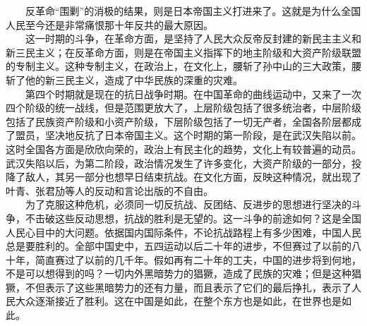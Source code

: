 \documentclass[cn,11pt,chinese]{elegantbook}
\begin{document}
　　反革命“围剿”的消极的结果，则是日本帝国主义打进来了。这就是为什么全国人民至今还是非常痛恨那十年反共的最大原因。\\
　　这一时期的斗争，在革命方面，是坚持了人民大众反帝反封建的新民主主义和新三民主义；在反革命方面，则是在帝国主义指挥下的地主阶级和大资产阶级联盟的专制主义。这种专制主义，在政治上，在文化上，腰斩了孙中山的三大政策，腰斩了他的新三民主义，造成了中华民族的深重的灾难。\\
　　第四个时期就是现在的抗日战争时期。在中国革命的曲线运动中，又来了一次四个阶级的统一战线，但是范围更放大了，上层阶级包括了很多统治者，中层阶级包括了民族资产阶级和小资产阶级，下层阶级包括了一切无产者，全国各阶层都成了盟员，坚决地反抗了日本帝国主义。这个时期的第一阶段，是在武汉失陷以前。这时全国各方面是欣欣向荣的，政治上有民主化的趋势，文化上有较普遍的动员。武汉失陷以后，为第二阶段，政治情况发生了许多变化，大资产阶级的一部分，投降了敌人，其另一部分也想早日结束抗战。在文化方面，反映这种情况，就出现了叶青、张君劢等人的反动和言论出版的不自由。\\
　　为了克服这种危机，必须同一切反抗战、反团结、反进步的思想进行坚决的斗争，不击破这些反动思想，抗战的胜利是无望的。这一斗争的前途如何？这是全国人民心目中的大问题。依据国内国际条件，不论抗战路程上有多少困难，中国人民总是要胜利的。全部中国史中，五四运动以后二十年的进步，不但赛过了以前的八十年，简直赛过了以前的几千年。假如再有二十年的工夫，中国的进步将到何地，不是可以想得到的吗？一切内外黑暗势力的猖獗，造成了民族的灾难；但是这种猖獗，不但表示了这些黑暗势力的还有力量，而且表示了它们的最后挣扎，表示了人民大众逐渐接近了胜利。这在中国是如此，在整个东方也是如此，在世界也是如此。\\
\end{document}
